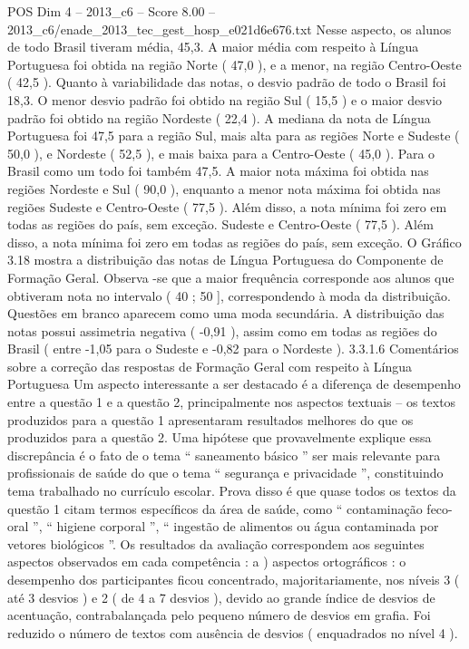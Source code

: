\begin{textsample}{POS Dim 4 – 2013\_c6 – Score 8.00 – 2013\_c6/enade\_2013\_tec\_gest\_hosp\_e021d6e676.txt}
Nesse aspecto, os alunos de todo Brasil tiveram média, 45,3.
A maior média com respeito à Língua Portuguesa foi obtida na região Norte ( 47,0 ), e a menor, na região Centro-Oeste ( 42,5 ).
Quanto à variabilidade das notas, o desvio padrão de todo o Brasil foi 18,3.
O menor desvio padrão foi obtido na região Sul ( 15,5 ) e o maior desvio padrão foi obtido na região Nordeste ( 22,4 ).
A mediana da nota de Língua Portuguesa foi 47,5 para a região Sul, mais alta para as regiões Norte e Sudeste ( 50,0 ), e Nordeste ( 52,5 ), e mais baixa para a Centro-Oeste ( 45,0 ).
Para o Brasil como um todo foi também 47,5.
A maior nota máxima foi obtida nas regiões Nordeste e Sul ( 90,0 ), enquanto a menor nota máxima foi obtida nas regiões Sudeste e Centro-Oeste ( 77,5 ).
Além disso, a nota mínima foi zero em todas as regiões do país, sem exceção.
Sudeste e Centro-Oeste ( 77,5 ).
Além disso, a nota mínima foi zero em todas as regiões do país, sem exceção.
O Gráfico 3.18 mostra a distribuição das notas de Língua Portuguesa do Componente de Formação Geral.
Observa -se que a maior frequência corresponde aos alunos que obtiveram nota no intervalo ( 40 ; 50 ], correspondendo à moda da distribuição.
Questões em branco aparecem como uma moda secundária.
A distribuição das notas possui assimetria negativa ( -0,91 ), assim como em todas as regiões do Brasil ( entre -1,05 para o Sudeste e -0,82 para o Nordeste ). 3.3.1.6 Comentários sobre a correção das respostas de Formação Geral com respeito à Língua Portuguesa Um aspecto interessante a ser destacado é a diferença de desempenho entre a questão 1 e a questão 2, principalmente nos aspectos textuais – os textos produzidos para a questão 1 apresentaram resultados melhores do que os produzidos para a questão 2.
Uma hipótese que provavelmente explique essa discrepância é o fato de o tema “ saneamento básico ” ser mais relevante para profissionais de saúde do que o tema “ segurança e privacidade ”, constituindo tema trabalhado no currículo escolar.
Prova disso é que quase todos os textos da questão 1 citam termos específicos da área de saúde, como “ contaminação feco-oral ”, “ higiene corporal ”, “ ingestão de alimentos ou água contaminada por vetores biológicos ”.
Os resultados da avaliação correspondem aos seguintes aspectos observados em cada competência : a ) aspectos ortográficos : o desempenho dos participantes ficou concentrado, majoritariamente, nos níveis 3 ( até 3 desvios ) e 2 ( de 4 a 7 desvios ), devido ao grande índice de desvios de acentuação, contrabalançada pelo pequeno número de desvios em grafia.
Foi reduzido o número de textos com ausência de desvios ( enquadrados no nível 4 ).

\end{textsample}
